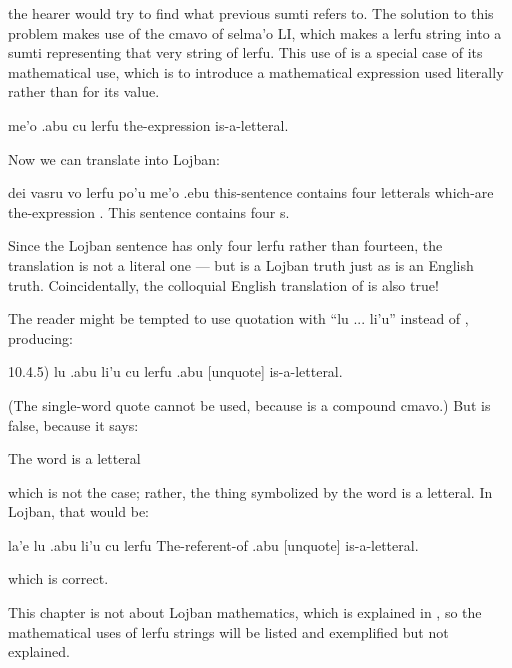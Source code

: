 {\noindent}the hearer would try to find what previous sumti 
    refers to. The solution to this problem makes use of the cmavo
     of selma'o LI, which makes a lerfu string into a sumti
    representing that very string of lerfu. This use of  is
    a special case of its mathematical use, which is to introduce a
    mathematical expression used literally rather than for its
    value.
\begin{example}
me'o .abu cu lerfu\n
the-expression  is-a-letteral.
\end{example}

Now we can translate  into
    Lojban:
\begin{example}
dei vasru vo lerfu\n
\T	po'u me'o .ebu\n
this-sentence contains four letterals\n
\T	which-are the-expression .\n
This sentence contains four s.
\end{example}

Since the Lojban sentence has only four  lerfu rather
    than fourteen, the translation is not a literal one --- but  is a Lojban truth just as  is an English truth.
    Coincidentally, the colloquial English translation of  is also true!

 The reader might be tempted to use quotation with ``lu ...
    li'u'' instead of , producing:

\label{html:e10d4.5}
10.4.5)    lu .abu li'u cu lerfu
     .abu [unquote] is-a-letteral.

(The single-word quote  cannot be used, because 
    is a compound cmavo.) But  is
    false, because it says:
\begin{example}
The word  is a letteral
\end{example}

{\noindent}which is not the case; rather, the thing symbolized by the word
     is a letteral. In Lojban, that would be:
\begin{example}
la'e lu .abu li'u cu lerfu\n
The-referent-of  .abu [unquote] is-a-letteral.
\end{example}

{\noindent}which is correct.



This chapter is not about Lojban mathematics, which is
    explained in , so the
    mathematical uses of lerfu strings will be listed and
    exemplified but not explained.

